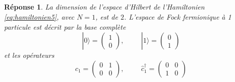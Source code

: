 \documentclass{article}
\numberwithin{equation}{section}
\theoremstyle{solution}
\newtheorem{solution}{Réponse}[section]
\begin{document}
\subsection{}
\begin{solution}
        La dimension de l'espace d'Hilbert de l'Hamiltonien \eqref{eq:hamiltonien5}, avec $N=1$, est de $2$. 
        L'espace de Fock fermionique à 1 particule est décrit par la base complète
        \begin{equation}\label{eq:base_fermion}
                | 0 \rangle = \begin{pmatrix}
                        1 \\ 0
                \end{pmatrix},
                \hspace{1cm} 
                | 1 \rangle = \begin{pmatrix}
                        0 \\ 1
                \end{pmatrix}
        \end{equation} 
        et les opérateurs
        \begin{equation}
                \hat{c}_1 = \begin{pmatrix}
                        0 & 1 \\
                        0 & 0
                \end{pmatrix}
                ,\hspace{1cm}
                \hat{c}^{\dagger}_1 = \begin{pmatrix}
                        0 & 0 \\
                        1 & 0
                \end{pmatrix}
        \end{equation} 
\end{solution}
\end{document}
